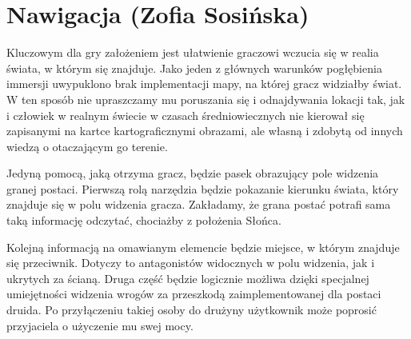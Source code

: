 \section{Nawigacja (Zofia Sosińska)}\label{chap:naw}

Kluczowym dla gry założeniem jest ułatwienie graczowi wczucia się w realia świata, w którym się znajduje. 
Jako jeden z głównych warunków pogłębienia immersji uwypuklono brak implementacji mapy, na której gracz widziałby świat. 
W ten sposób nie upraszczamy mu poruszania się i odnajdywania lokacji tak,
jak i człowiek w realnym świecie w czasach średniowiecznych nie kierował się zapisanymi na kartce kartograficznymi obrazami, 
ale własną i zdobytą od innych wiedzą o otaczającym go terenie. 

Jedyną pomocą, jaką otrzyma gracz, będzie pasek obrazujący pole widzenia granej postaci.
Pierwszą rolą narzędzia będzie pokazanie kierunku świata, który znajduje się w polu widzenia gracza.
Zakładamy, że grana postać potrafi sama taką informację odczytać, chociażby z położenia Słońca.

Kolejną informacją na omawianym elemencie będzie miejsce, w którym znajduje się przeciwnik. 
Dotyczy to antagonistów widocznych w polu widzenia, jak i ukrytych za ścianą. 
Druga część będzie logicznie możliwa dzięki specjalnej umiejętności widzenia wrogów za przeszkodą zaimplementowanej dla postaci druida. 
Po przyłączeniu takiej osoby do drużyny użytkownik może poprosić przyjaciela o użyczenie mu swej mocy.
